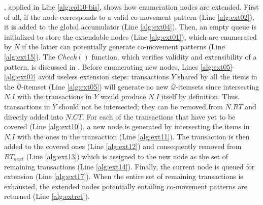 \documentclass[preprint,12pt,authoryear]{elsarticle} %
\begin{document}
, applied in  Line \ref{alg:col10-bis}, shows how enumeration nodes are extended.
First of all, if the node corresponds to a valid co-movement pattern (Line \ref{alg:ext02}), it is added to the global accumulator (Line \ref{alg:ext04}).
Then, an empty queue is initialized to store the extendable nodes (Line \ref{alg:ext01}), which are enumerated by $N$ if the latter can potentially generate co-movement patterns (Line \ref{alg:ext15}).
The $Check()$ function, which verifies validity and extensibility of a pattern, is discussed in .
Before enumerating new nodes, Lines \ref{alg:ext05}-\ref{alg:ext07} avoid useless extension steps: transactions $Y$ shared by all the items in the $\bar{\mathcal{Q}}$-itemset (Line \ref{alg:ext05}) will generate no new $\bar{\mathcal{Q}}$-itemsets since intersecting $N.I$ with the transactions in $Y$ would produce $N.I$ itself by definition.
Thus, transactions in $Y$ should not be intersected; they can be removed from $N.RT$ and directly added into $N.CT$.
For each of the transactions that have yet to be covered (Line \ref{alg:ext10}), a new node is generated by intersecting the items in $N.I$ with the ones in the transaction (Line \ref{alg:ext11}).
The transaction is then added to the covered ones (Line \ref{alg:ext12}) and consequently removed from $RT_{next}$ (Line \ref{alg:ext13}) which is assigned to the new node as the set of remaining transactions (Line \ref{alg:ext14}).
Finally, the current node is queued for extension (Line \ref{alg:ext17}).
When the entire set of remaining transactions is exhausted, the extended nodes potentially entailing co-movement patterns are returned (Line \ref{alg:extret}).
\end{document}
